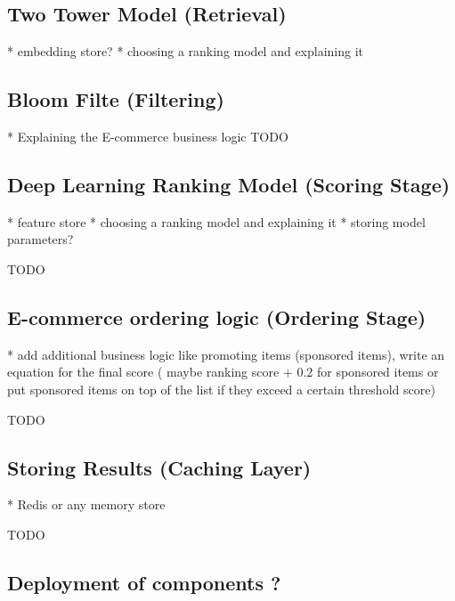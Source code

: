 \subsection{Two Tower Model (Retrieval)}
* embedding store?
* choosing a ranking model and explaining it

\subsection{Bloom Filte (Filtering)}
* Explaining the E-commerce business logic
TODO 



\subsection{Deep Learning Ranking Model (Scoring Stage)}

* feature store 
* choosing a ranking model and explaining it
* storing model parameters?


TODO

\subsection{E-commerce ordering logic (Ordering Stage)}

* add additional business logic like promoting items (sponsored items), write an equation for the final score ( maybe ranking score + 0.2 for sponsored items or put sponsored items on top of the list if they exceed a certain threshold score)

TODO

\subsection{Storing Results (Caching Layer)}

* Redis or any memory store

TODO

\subsection{Deployment of components ?}


\minitoc
